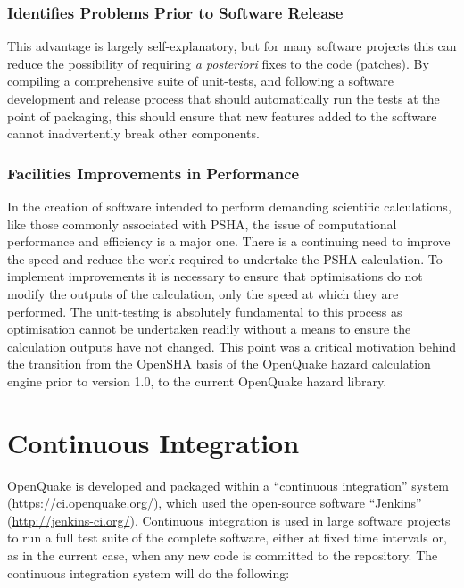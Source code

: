 \subsubsection{Identifies Problems Prior to Software Release}
This advantage is largely self-explanatory, but for many software projects 
this can reduce the possibility of requiring \emph{a posteriori} fixes to
the code (patches). By compiling a comprehensive suite of unit-tests, and 
following a software development and release process that should 
automatically run the tests at the point of packaging, this should ensure 
that new features added to the software cannot inadvertently break other 
components.
%
\subsubsection{Facilities Improvements in Performance}
In the creation of software intended to perform demanding scientific 
calculations, like those commonly associated with PSHA, the issue of 
computational performance and efficiency is a major one. 
There is a continuing need to improve the speed and reduce the work 
required to undertake the PSHA calculation. To implement improvements
it is necessary to ensure that optimisations do not modify the outputs 
of the calculation, only the speed at which they are performed. 
The unit-testing is absolutely fundamental to this process as 
optimisation cannot be undertaken readily without a means to ensure 
the calculation outputs have not changed. 
This point was a critical motivation behind the transition from the 
OpenSHA basis of the OpenQuake hazard calculation engine prior to 
version 1.0, to the current OpenQuake hazard library.
%
\section{Continuous Integration}
OpenQuake is developed and packaged within a ``continuous integration'' 
system (\href{https://ci.openquake.org/}{https://ci.openquake.org/}),
which used the open-source software ``Jenkins'' 
(\href{http://jenkins-ci.org/}{http://jenkins-ci.org/}). 
Continuous integration is used in large software projects to run a 
full test suite of the complete software, either at fixed time 
intervals or, as in the current case, when any new code is committed
to the repository. The continuous integration system will do the 
following:

